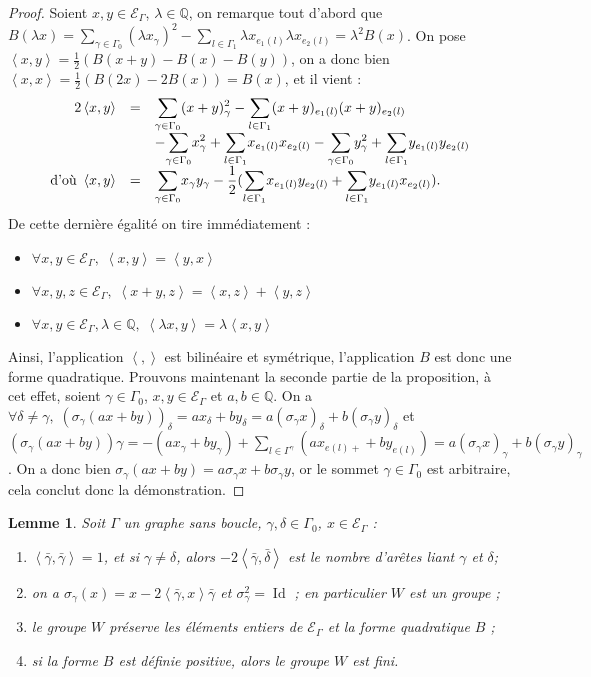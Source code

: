 \documentclass[a4paper,10pt]{article}
\newtheorem{lm}[thm]{Lemme}%
\DeclareMathOperator{\Id}{Id}
\newcommand{\ps}[2]{\left\langle#1,#2\right\rangle}
\newcommand{\EG}{\mathscr{E}_\Gamma}
\newcommand{\dps}{\displaystyle}
\begin{document}
		\begin{proof}
			Soient $x,y\in\EG$, $\lambda\in\mathbb{Q}$, on remarque tout d'abord que $B(\lambda x)=\sum_{\gamma\in\Gamma_0}(\lambda x_\gamma)^2-\sum_{l\in\Gamma_1}\lambda x_{e_1(l)}\lambda x_{e_2(l)}=\lambda^2B(x)$. On pose $\ps{x}{y}=\frac{1}{2}(B(x+y)-B(x)-B(y))$, on a donc bien $\ps{x}{x}=\frac{1}{2}(B(2x)-2B(x))=B(x)$, et il vient :
			\[
		\begin{array}{>{\dps}r>{\dps}l>{\dps}l}
			2\ps{x}{y}&=& \underset{\gamma\in\Gamma_0}{\sum}(x+y)_\gamma^2 -\underset{l\in\Gamma_1}{\sum}(x+y)_{e_1(l)}(x+y)_{e_2(l)}\\
		&&-\underset{\gamma\in\Gamma_0}{\sum}x_\gamma^2 +\underset{l\in\Gamma_1}{\sum}x_{e_1(l)}x_{e_2(l)}-\underset{\gamma\in\Gamma_0}{\sum}y_\gamma^2 +\underset{l\in\Gamma_1}{\sum}y_{e_1(l)}y_{e_2(l)}\\
		\text{d'où }\ps{x}{y}&=&  \underset{\gamma\in\Gamma_0}{\sum}x_\gamma y_\gamma -\frac{1}{2}(\underset{l\in\Gamma_1}{\sum}x_{e_1(l)} y_{e_2(l)}+\underset{l\in\Gamma_1}{\sum}y_{e_1(l)} x_{e_2(l)}).
		\end{array}
			\]
			De cette dernière égalité on tire immédiatement :
			\begin{itemize}
					\item $\forall x,y\in\EG,\; \ps{x}{y}=\ps{y}{x}$
					\item $\forall x,y,z\in\EG,\; \ps{x+y}{z}=\ps{x}{z}+\ps{y}{z}$
					\item $\forall x,y\in\EG,\lambda\in\mathbb Q,\;\ps{\lambda x}{y}=\lambda\ps{x}{y}$
			\end{itemize}
			Ainsi, l'application $\ps{}{}$ est bilinéaire et symétrique, l'application $B$ est donc une forme quadratique. Prouvons maintenant la seconde partie de la proposition, à cet effet, soient $\gamma\in\Gamma_0$, $x,y\in\EG$ et $a,b\in\mathbb Q$. On a $\forall\delta\neq\gamma,\;(\sigma_\gamma(ax+by))_\delta=ax_\delta+by_\delta=a(\sigma_\gamma x)_\delta+b(\sigma_\gamma y)_\delta$ et $(\sigma_\gamma (ax+by))\gamma=-(ax_\gamma+by_\gamma)+\sum_{l\in\Gamma^\gamma}(ax_{e(l)+}+by_{e(l)})=a(\sigma_\gamma x)_\gamma+b(\sigma_\gamma y)_\gamma$. On a donc bien $\sigma_\gamma(ax+by)=a\sigma_\gamma x+b\sigma_\gamma y$, or le sommet $\gamma\in\Gamma_{0}$ est arbitraire, cela conclut donc la démonstration.
		\end{proof}
		\begin{lm}
			\label{elem}
		Soit $\Gamma$ un graphe sans boucle, $\gamma,\delta\in\Gamma_0$, $x\in\EG$ :
		\begin{enumerate}
			\item $\ps{\bar\gamma}{\bar\gamma}=1$, et si $\gamma\neq\delta$, alors $-2\ps{\bar\gamma}{\bar\delta}$ est le nombre d'arêtes liant $\gamma$ et $\delta$;
			\item on a $\sigma_\gamma(x)=x-2\ps{\bar\gamma}{x}\bar\gamma$ et $\sigma_\gamma^2=\Id$ ; en particulier $W$ est un groupe ;
			\item le groupe $W$ préserve les éléments entiers de $\EG$ et la forme quadratique $B$ ;
			\item si la forme $B$ est définie positive, alors le groupe $W$ est fini.
		\end{enumerate}
\end{lm}
\end{document}
